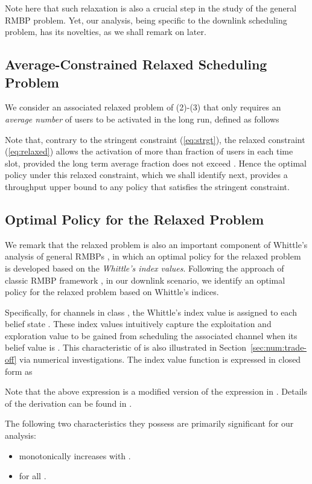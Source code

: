 \documentclass[11pt,twocolumn]{IEEEtran}
\begin{document}
Note here that such relaxation is also a crucial step in the study
of the general RMBP problem. Yet, our analysis, being specific to
the downlink scheduling problem, has its novelties, as we shall
remark on later.

\subsection{Average-Constrained Relaxed Scheduling Problem}

We consider an associated relaxed problem of (2)-(3) that only requires an \emph{average number} of users to be activated in the long run, defined as follows




Note that, contrary to the stringent constraint (\ref{eq:strgt}), the relaxed constraint (\ref{eq:relaxed}) allows the activation of more than  fraction of users in each time slot, provided the long term average fraction does not exceed . Hence the optimal policy under this relaxed constraint, which we shall identify next, provides a throughput upper bound to any policy that satisfies the stringent constraint.

\subsection{Optimal Policy for the Relaxed Problem}

We remark that the relaxed problem is also an important component of Whittle's analysis of general RMBPs \cite{Whittle}, in which an optimal policy for the relaxed problem is developed based on the \emph{Whittle's index values}. Following the approach of classic RMBP framework \cite{Whittle}, in our downlink scenario, we identify an optimal policy for the relaxed problem based on Whittle's indices.

Specifically, for channels in class , the Whittle's index value
 is assigned to each belief state .
These index values intuitively capture the exploitation and
exploration value to be gained from scheduling the associated
channel when its belief value is .  This characteristic of
 is also illustrated in Section~\ref{sec:num:trade-off} via
numerical investigations. The index value function is expressed in closed form as 


Note that the above expression is a modified version of the expression in \cite{Zhao_index}. Details of the derivation can be found in \cite{Wenzhuo_infocom12}.

The following two characteristics
they possess are primarily significant for our analysis:
\begin{itemize}
\item  monotonically increases with .
\item  for all .
\end{itemize}
\end{document}
